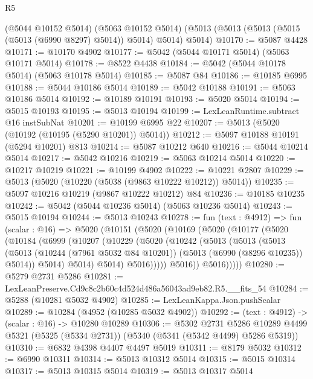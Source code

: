 \begin{lexlean}{R5}
\begin{coremodule}
    (@5044 @10152 @5014)
    (@5063 @10152 @5014)
    (@5013 (@5013 (@5013 (@5015 (@5013 (@6990 @8297) @5014)) @5014) @5014) @5014)
@10170 := @5087 @4428
@10171 := @10170 @4902
@10177 := @5042 (@5044 @10171 @5014) (@5063 @10171 @5014)
@10178 := @8522 @4438
@10184 := @5042 (@5044 @10178 @5014) (@5063 @10178 @5014)
@10185 := @5087 @84
@10186 := @10185 @6995
@10188 := @5044 @10186 @5014
@10189 := @5042 @10188
@10191 := @5063 @10186 @5014
@10192 := @10189 @10191
@10193 := @5020 @5014
@10194 := @5015 @10193
@10195 := @5013 @10194
@10199 := LexLeanRuntime.subtract @16 instSubNat
@10201 := @10199 @6995 @22
@10207 := @5013 (@5020 (@10192 (@10195 (@5290 @10201)) @5014))
@10212 := @5097 @10188 @10191 (@5294 @10201) @813
@10214 := @5087 @10212 @640
@10216 := @5044 @10214 @5014
@10217 := @5042 @10216
@10219 := @5063 @10214 @5014
@10220 := @10217 @10219
@10221 := @10199 @4902
@10222 := @10221 @2807
@10229 := @5013 (@5020 (@10220 (@5038 (@9863 @10222 @10212)) @5014))
@10235 := @5097 @10216 @10219 (@9867 @10222 @10212) @84
@10236 := @10185 @10235
@10242 := @5042 (@5044 @10236 @5014) (@5063 @10236 @5014)
@10243 := @5015 @10194
@10244 := @5013 @10243
@10278 := fun (text : @4912) =>
  fun (scalar : @16) =>
  @5020
    (@10151
      (@5020
        (@10169
          (@5020
            (@10177
              (@5020
                (@10184
                  (@6999
                    (@10207
                      (@10229
                        (@5020
                          (@10242
                            (@5013
                              (@5013
                                (@5013
                                  (@5013
                                    (@10244 (@7961 @5032 @84 @10201))
                                    (@5013 (@6990 (@8296 @10235)) @5014))
                                  @5014)
                                @5014)
                              @5014)
                            @5016)))))
                  @5016))
              @5016)))))
@10280 := @5279 @2731 @5286
@10281 := LexLeanPreserve.Cd9c8c2b60c4d524d486a56043ad9eb82.R5.__fits_54
@10284 := @5288 (@10281 @5032 @4902)
@10285 := LexLeanKappa.Json.pushScalar
@10289 := @10284 (@4952 (@10285 @5032 @4902))
@10292 := (text : @4912) -> (scalar : @16) -> @10280 @10289
@10306 := @5302
    @2731
    @5286
    @10289
    @4499
    @5321
    (@5325 (@5334 @2731))
    (@5340 (@5341 (@5342 @4499) @5286 @5319))
@10310 := @6832 @4398 @4407 @4497 @5019
@10311 := @8179 @5032
@10312 := @6990 @10311
@10314 := @5013 @10312 @5014
@10315 := @5015 @10314
@10317 := @5013 @10315 @5014
@10319 := @5013 @10317 @5014

\end{coremodule}
\end{lexlean}
